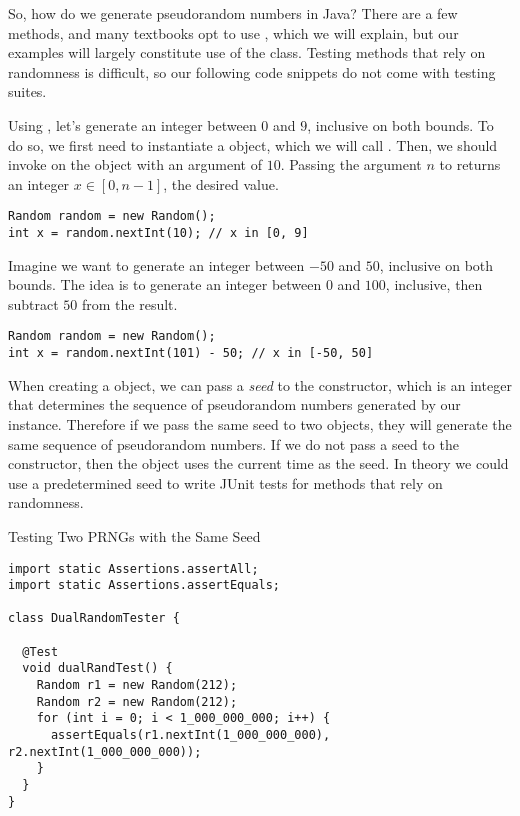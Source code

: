 So, how do we generate pseudorandom numbers in Java? There are a few methods, and many textbooks opt to use , which we will explain, but our examples will largely constitute use of the  class. Testing methods that rely on randomness is difficult, so our following code snippets do not come with testing suites. 

\example Using , let's generate an integer between $0$ and $9$, inclusive on both bounds. To do so, we first need to instantiate a  object, which we will call . Then, we should invoke  on the  object with an argument of $10$. Passing the argument $n$ to  returns an integer $x \in [0, n-1]$, the desired value.

\begin{verbatim}
Random random = new Random();
int x = random.nextInt(10); // x in [0, 9]
\end{verbatim}

\example Imagine we want to generate an integer between $-50$ and $50$, inclusive on both bounds. The idea is to generate an integer between $0$ and $100$, inclusive, then subtract $50$ from the result.

\begin{verbatim}
Random random = new Random();
int x = random.nextInt(101) - 50; // x in [-50, 50]
\end{verbatim}

\example When creating a  object, we can pass a \textit{seed} to the constructor, which is an integer that determines the sequence of pseudorandom numbers generated by our  instance. Therefore if we pass the same seed to two  objects, they will generate the same sequence of pseudorandom numbers. If we do not pass a seed to the constructor, then the  object uses the current time as the seed. In theory we could use a predetermined seed to write JUnit tests for methods that rely on randomness.

\begin{cl}{Testing Two PRNGs with the Same Seed}
\begin{lstlisting}[language=MyJava]
import static Assertions.assertAll;
import static Assertions.assertEquals;

class DualRandomTester {
  
  @Test
  void dualRandTest() {
    Random r1 = new Random(212);
    Random r2 = new Random(212);
    for (int i = 0; i < 1_000_000_000; i++) {
      assertEquals(r1.nextInt(1_000_000_000), r2.nextInt(1_000_000_000));
    }
  }
}
\end{lstlisting}
\end{cl}

